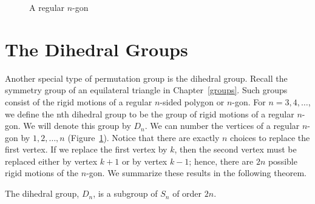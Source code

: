 \medskip
 
\begin{figure}[hbt] %
\begin{center}

\end{center}
\caption{A regular $n$-gon}
\label{regular}
\end{figure}
 

\section{The Dihedral Groups}
 

Another special type of permutation group is the dihedral group. 
Recall the symmetry group of an equilateral triangle in Chapter~\ref{groups}. 
Such groups consist of the  rigid motions of a regular $n$-sided 
polygon or $n$-gon. For $n = 3, 4, \ldots$, we define the {\bfi 
nth dihedral group\/} to be the group of 
rigid motions of a regular $n$-gon.  We will denote this group by
$D_n$\label{dihedralgroup}.  We can number the vertices of a regular
$n$-gon by $1, 2, \ldots, n$ (Figure~\ref{regular}).  Notice that
there are exactly $n$ choices to replace the first vertex.  If we
replace the first vertex by $k$, then the second vertex must be replaced
either by vertex $k+1$ or by vertex $k-1$; hence, there are $2n$
possible rigid motions of the $n$-gon.  We summarize these results in
the following theorem.  

 
\begin{theorem}
The dihedral group, $D_n$, is a subgroup of $S_n$ of order $2n$.
\end{theorem}
 

